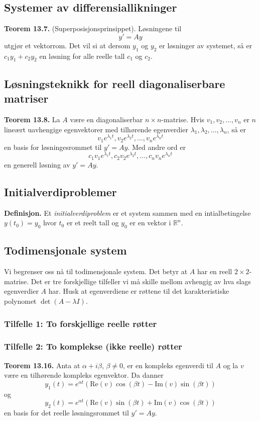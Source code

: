 \documentclass{article}
\begin{document}
\subsection{Systemer av differensiallikninger}
\textbf{Teorem 13.7.} (Superposisjonsprinsippet). Løsningene til
\[ y' = Ay \]
utgjør et vektorrom. Det vil si at dersom $y_1$ og $y_2$ er løsninger av systemet, så er $c_1y_1 + c_2y_2$ en løsning for alle reelle tall $c_1$ og $c_2$.


\subsection{Løsningsteknikk for reell diagonaliserbare matriser}
\textbf{Teorem 13.8.} La $A$ være en diagonaliserbar $n \times n$-matrise. Hvis $v_1, v_2, \dots, v_n$ er $n$ lineært uavhengige egenvektorer med tilhørende egenverdier $\lambda_1, \lambda_2, \dots, \lambda_n$, så er
\[ v_1e^{\lambda_1t}, v_2e^{\lambda_2t}, \dots, v_ne^{\lambda_nt} \]
en basis for løsningesrommet til $y' = Ay$. Med andre ord er
\[ c_1v_1e^{\lambda_1t}, c_2v_2e^{\lambda_2t}, \dots, c_nv_ne^{\lambda_nt} \]
en generell løsning av $y' = Ay$.


\subsection{Initialverdiproblemer}
\textbf{Definisjon.} Et \textit{initialverdiproblem} er et system sammen med en intialbetingelse $y(t_0) = y_0$ hvor $t_0$ er et reelt tall og $y_0$ er en vektor i $\mathbb{R}^n$.


\subsection{Todimensjonale system}
Vi begrenser oss nå til todimensjonale system. Det betyr at $A$ har en reell $2 \times 2$-matrise. Det er tre forskjellige tilfeller vi må skille mellom avhengig av hva slags egenverdier $A$ har. Husk at egenverdiene er røttene til det karakteristiske polynomet $\det{(A-\lambda I)}$.

\subsubsection{Tilfelle 1: To forskjellige reelle røtter}

\subsubsection{Tilfelle 2: To komplekse (ikke reelle) røtter}
\textbf{Teorem 13.16.} Anta at $\alpha + i \beta$, $\beta \neq 0$, er en kompleks egenverdi til $A$ og la $v$ være en tilhørende kompleks egenvektor. Da danner
\[y_1(t) = e^{\alpha t}(\text{Re}(v)\cos{(\beta t)} - \text{Im}(v)\sin{(\beta t)})\]
og 
\[y_2(t) = e^{\alpha t}(\text{Re}(v)\sin{(\beta t)} + \text{Im}(v)\cos{(\beta t)})\]
en basis for det reelle løsningsrommet til $y' = Ay$.
\end{document}
